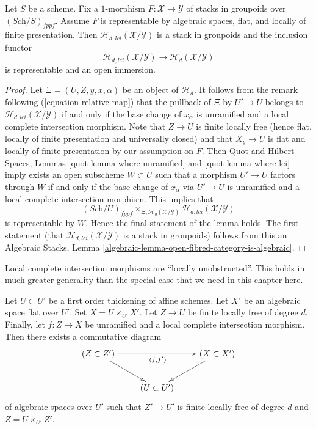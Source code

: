\begin{lemma}
\label{lemma-lci-locus-stack-in-groupoids}
Let $S$ be a scheme. Fix a $1$-morphism
$F : \mathcal{X} \longrightarrow \mathcal{Y}$
of stacks in groupoids over $(\textit{Sch}/S)_{fppf}$. 
Assume $F$ is representable by algebraic spaces, flat, and locally
of finite presentation. Then $\mathcal{H}_{d, lci}(\mathcal{X}/\mathcal{Y})$
is a stack in groupoids and the inclusion functor
$$
\mathcal{H}_{d, lci}(\mathcal{X}/\mathcal{Y})
\longrightarrow
\mathcal{H}_d(\mathcal{X}/\mathcal{Y})
$$
is representable and an open immersion.
\end{lemma}

\begin{proof}
Let $\Xi = (U, Z, y, x, \alpha)$ be an object of $\mathcal{H}_d$. It follows
from the remark following
(\ref{equation-relative-map})
that the pullback of $\Xi$ by $U' \to U$ belongs to
$\mathcal{H}_{d, lci}(\mathcal{X}/\mathcal{Y})$ if and only if the base
change of $x_\alpha$ is unramified and a local complete intersection morphism.
Note that $Z \to U$ is finite locally free (hence flat, locally of
finite presentation and universally closed) and that $X_y \to U$ is
flat and locally of finite presentation by our assumption on $F$. Then
Quot and Hilbert Spaces, Lemmas \ref{quot-lemma-where-unramified} and
\ref{quot-lemma-where-lci}
imply exists an open subscheme $W \subset U$ such that a morphism
$U' \to U$ factors through $W$ if and only if the base change of
$x_\alpha$ via $U' \to U$ is unramified and a local complete intersection
morphism. This implies that
$$
(\textit{Sch}/U)_{fppf}
\times_{\Xi, \mathcal{H}_d(\mathcal{X}/\mathcal{Y})}
\mathcal{H}_{d, lci}(\mathcal{X}/\mathcal{Y})
$$
is representable by $W$. Hence the final statement of the lemma
holds. The first statement (that
$\mathcal{H}_{d, lci}(\mathcal{X}/\mathcal{Y})$ is a stack in groupoids)
follows from this an
Algebraic Stacks,
Lemma \ref{algebraic-lemma-open-fibred-category-is-algebraic}.
\end{proof}

\noindent
Local complete intersection morphisms are ``locally unobstructed''.
This holds in much greater generality than the special case
that we need in this chapter here.

\begin{lemma}
\label{lemma-lci-unobstructed}
Let $U \subset U'$ be a first order thickening of affine schemes.
Let $X'$ be an algebraic space flat over $U'$. Set $X = U \times_{U'} X'$.
Let $Z \to U$ be finite locally free of degree $d$. Finally, let
$f : Z \to X$ be unramified and a local complete intersection morphism.
Then there exists a commutative diagram
$$
\xymatrix{
(Z \subset Z') \ar[rd] \ar[rr]_{(f, f')} & & (X \subset X') \ar[ld] \\
& (U \subset U')
}
$$
of algebraic spaces over $U'$ such that $Z' \to U'$ is finite locally free
of degree $d$ and $Z = U \times_{U'} Z'$.
\end{lemma}

